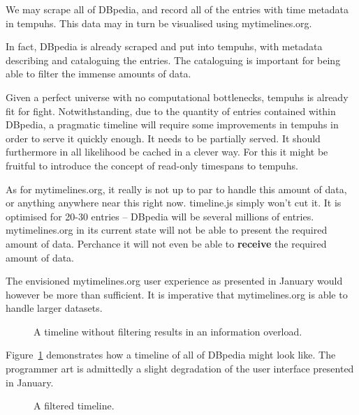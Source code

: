 We may scrape all of DBpedia, and record all of the entries with time metadata 
in tempuhs. This data may in turn be visualised using mytimelines.org.

In fact, DBpedia is already scraped and put into tempuhs, with metadata 
describing and cataloguing the entries. The cataloguing is important for being
able to filter the immense amounts of data.

Given a perfect universe with no computational bottlenecks, tempuhs is already 
fit for fight. Notwithstanding, due to the quantity of entries contained 
within DBpedia, a pragmatic timeline will require some improvements in tempuhs 
in order to serve it quickly enough. It needs to be partially served. It 
should furthermore in all likelihood be cached in a clever way. For this it 
might be fruitful to introduce the concept of read-only timespans to tempuhs.

As for mytimelines.org, it really is not up to par to handle this amount of 
data, or anything anywhere near this right now. timeline.js simply won't cut 
it. It is optimised for 20-30 entries\cite{timelinejsfaq} -- DBpedia will be 
several millions of entries. mytimelines.org in its current state will not be 
able to present the required amount of data. Perchance it will not even be 
able to \textbf{receive} the required amount of data.

The envisioned mytimelines.org user experience as presented in 
January\cite{timelinesjanuary} would however be more than sufficient. It is 
imperative that mytimelines.org is able to handle larger datasets.

\begin{figure}[H]
  \centering
  \begin{scale}{0.3}
    
  \end{scale}
  \caption{A timeline without filtering results in an information overload.}
  \label{fig:overload}
\end{figure}

Figure~\ref{fig:overload} demonstrates how a timeline of all of DBpedia might 
look like. The programmer art is admittedly a slight degradation of the user 
interface presented in January.

\begin{figure}[H]
  \centering
  \begin{scale}{0.3}
    
  \end{scale}
  \caption{A filtered timeline.}
  \label{fig:filtered}
\end{figure}

